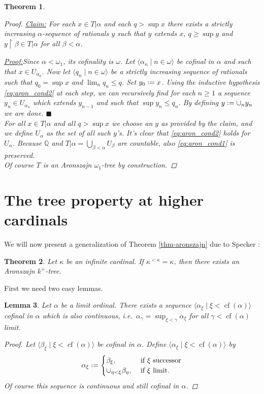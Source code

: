 \documentclass[11pt,a4paper]{report}
\newtheorem{theorem}{Theorem}[chapter] %
\newtheorem{lemma}[theorem]{Lemma}
\theoremstyle{definition}
\theoremstyle{num.custom-title}
\theoremstyle{custom-title}
\newenvironment{claim}[1]{\par\noindent\underline{Claim#1:}\space}{} %
\newenvironment{claimproof}[1]{\par\noindent\underline{Proof:}\space#1}{\leavevmode\unskip\penalty9999 \hbox{}\nobreak\hfill\quad\hbox{$\blacksquare$}} %
\DeclareMathOperator{\restr}{\upharpoonright}
\DeclareMathOperator{\cf}{cf}
\newcommand{\Q}{\mathbb{Q}}
\newcommand*{\defeq}{\mathrel{\rlap{%
                     \raisebox{0.3ex}{$\cdot$}}%
                     \raisebox{-0.3ex}{$\cdot$}}%
                     =}
\begin{document}
\begin{theorem}
\begin{proof}
\begin{claim}{}
For each $x \in T|\alpha$ and each $q > \sup x$ there exists a strictly increasing $\alpha$-sequence of rationals $y$ such that $y$ extends $x$, $q \geq \sup y$ and $y \restr \beta \in T|\alpha$ for all $\beta<\alpha$.
\begin{claimproof}
Since $\alpha < \omega_1$, its cofinality is $\omega$. Let $\langle \alpha_n \mid n \in \omega \rangle$ be cofinal in $\alpha$ and such that $x \in U_{\alpha_0}$. Now let $\langle q_n \mid n \in \omega \rangle$ be a strictly increasing sequence of rationals such that $q_0 = \sup x$ and $\lim_n q_n \leq q$. Set $y_0 \defeq x$. Using the inductive hypothesis \eqref{eq:aron_cond2} at each step, we can recursively find for each $n \geq 1$ a sequence $y_n \in U_{\alpha_n}$ which extends $y_{n-1}$ and such that $\sup y_n \leq q_n$. By defining $y \defeq \cup_n y_n$ we are done.
\end{claimproof}
\end{claim}\\[6pt]
For all $x \in T|\alpha$ and all $q > \sup x$ we choose an $y$ as provided by the claim, and we define $U_\alpha$ as the set of all such $y$'s. It's clear that \eqref{eq:aron_cond2} holds for $U_\alpha$. Because $\Q$ and $T|\alpha = \bigcup_{\beta < \alpha} U_\beta$ are countable, also \eqref{eq:aron_cond1} is preserved.\\
Of course $T$ is an Aronszajn $\omega_1$-tree by construction.
\end{proof}
\end{theorem}

\section{The tree property at higher cardinals}

We will now present a generalization of Theorem \ref{thm-aronszajn} due to Specker \cite{Spe1949}:

\begin{theorem}\label{thm-aronszajn_k+_tree}
Let $\kappa$ be an infinite cardinal. If $\kappa^{<\kappa}=\kappa$, then there exists an Aronszajn $k^+$-tree.
\end{theorem}

First we need two easy lemmas.

\begin{lemma}\label{lemma-cof_continua}
Let $\alpha$ be a limit ordinal. There exists a sequence $\langle \alpha_\xi \mid \xi < \cf(\alpha) \rangle$ cofinal in $\alpha$ which is also \emph{continuous}, i.e.\ $\alpha_\gamma = \sup_{\xi<\gamma} \alpha_\xi$ for all $\gamma < \cf(\alpha)$ limit.
\begin{proof}
Let $\langle \beta_\xi \mid \xi < \cf(\alpha) \rangle$ be cofinal in $\alpha$. Define $\langle \alpha_\xi \mid \xi < \cf(\alpha) \rangle$ by
\[
\alpha_\xi \defeq
\begin{cases}
\beta_\xi, & \text{ if $\xi$ successor} \\
\cup_{\eta < \xi} \beta_\eta, & \text{ if $\xi$ limit}.
\end{cases}
\]
Of course this sequence is continuous and still cofinal in $\alpha$.
\end{proof}
\end{lemma}
\end{document}
